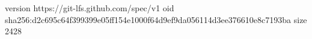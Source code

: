 version https://git-lfs.github.com/spec/v1
oid sha256:d2c695c64f399399e05ff154e1000f64d9ef9da056114d3ee376610e8c7193ba
size 2428
